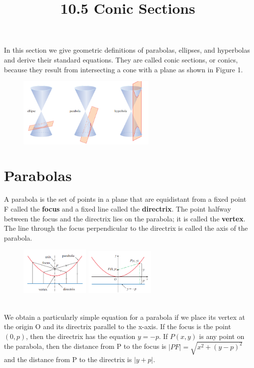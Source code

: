 \documentclass{article}
\title{10.5 Conic Sections}
\date{}
\author{}
\begin{document}
\maketitle
In this section we give geometric definitions of parabolas, ellipses, and hyperbolas and derive their standard equations. They are called conic sections, or conics, because they result from intersecting a cone with a plane as shown in Figure 1.
\begin{figure}[htbp]
    \centering
    \includegraphics[width=0.6\textwidth]{graph50.png}
\end{figure}


\section*{Parabolas}
A parabola is the set of points in a plane that are equidistant from a fixed point F called the \textbf{focus} and a fixed line called the \textbf{directrix}. The point halfway between the focus and the directrix lies on the parabola; it is called the \textbf{vertex}. 
\\The line through the focus perpendicular to the directrix is called the axis of the parabola.
\begin{figure}[htbp]
    \centering
    \includegraphics[width=0.3\textwidth]{graph51.png}
    \includegraphics[width=0.3\textwidth]{graph52.png}
\end{figure}
\\We obtain a particularly simple equation for a parabola if we place its vertex at the origin O and its directrix parallel to the x-axis. If the focus is the point $(0,p)$, then the directrix has the equation $y=-p$. If $P(x,y)$ is any point on the parabola, then the distance from P to the focus is $|PF| = \sqrt{x^2 + (y-p)^2}$ and the distance from P to the directrix is $|y+p|$.
\end{document}

